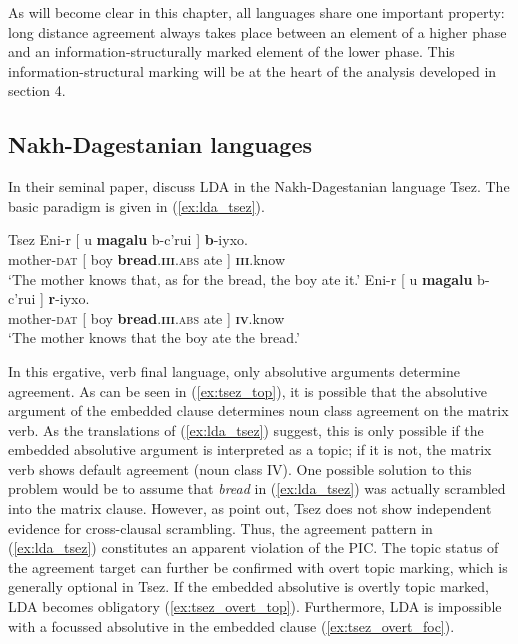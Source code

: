 \documentclass[output=paper
,modfonts
,nonflat]{langsci/langscibook}
\begin{document}
As will become clear in this chapter, all languages share one important property: long distance agreement always takes place between an element of a higher phase and an information-structurally marked element of the lower phase. This information-structural marking will be at the heart of the analysis developed in section 4.

\subsection{Nakh-Dagestanian languages}

In their seminal paper, \citet{Polinsky_Potsdam2001} discuss LDA in the Nakh-Dagestanian language Tsez. The basic paradigm is given in (\ref{ex:lda_tsez}).
\begin{exe}
	\ex Tsez \citep[][584]{Polinsky_Potsdam2001} \label{ex:lda_tsez}
	\xlist
	\ex	\label{ex:tsez_top}
		\gll Eni-r [ u \textbf{magalu} b-c’ru\textipa{\textbeltl}i ] \textbf{b}-iyxo.\\
			 mother-\textsc{dat} [ boy \textbf{bread}.\textsc{\textbf{iii}.abs} ate ]	\textsc{\textbf{iii}}.know\\
	 	\glt `The mother knows that, as for the bread, the boy ate it.' 
	\ex 
		\gll Eni-r [ u \textbf{magalu} b-c’ru\textipa{\textbeltl}i ] \textbf{r}-iyxo.\\
			 mother-\textsc{dat} [ boy \textbf{bread}.\textsc{\textbf{iii}.abs} ate ] \textsc{\textbf{iv}}.know\\
	    \glt `The mother knows that the boy ate the bread.'
	\endxlist
\end{exe} 
In this ergative, verb final language, only absolutive arguments determine agreement. As can be seen in (\ref{ex:tsez_top}), it is possible that the absolutive argument of the embedded clause determines noun class agreement on the matrix verb. As the translations of (\ref{ex:lda_tsez}) suggest, this is only possible if the embedded absolutive argument is interpreted as a topic; if it is not, the matrix verb shows default agreement (noun class IV). One possible solution to this problem would be to assume that \textit{bread} in (\ref{ex:lda_tsez}) was actually scrambled into the matrix clause. However, as \citet[][590]{Polinsky_Potsdam2001} point out, Tsez does not show independent evidence for cross-clausal scrambling. Thus, the agreement pattern in (\ref{ex:lda_tsez}) constitutes an apparent violation of the PIC. The topic status of the agreement target can further be confirmed with overt topic marking, which is generally optional in Tsez. If the embedded absolutive is overtly topic marked, LDA becomes obligatory (\ref{ex:tsez_overt_top}). Furthermore, LDA is impossible with a focussed absolutive in the embedded clause (\ref{ex:tsez_overt_foc}).
\end{document}
